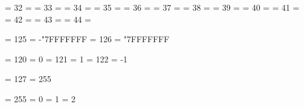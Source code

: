 \countdef   \lastallocatedcount     =    32 \lastallocatedcount     = \minallocatedregister
\countdef   \lastallocateddimen     =    33 \lastallocateddimen     = \minallocatedregister
\countdef   \lastallocatedskip      =    34 \lastallocatedskip      = \minallocatedregister
\countdef   \lastallocatedmuskip    =    35 \lastallocatedmuskip    = \minallocatedregister
\countdef   \lastallocatedbox       =    36 \lastallocatedbox       = \minallocatedregister
\countdef   \lastallocatedtoks      =    37 \lastallocatedtoks      = \minallocatedregister
\countdef   \lastallocatedread      =    38 \lastallocatedread      = \minallocatediochannel
\countdef   \lastallocatedwrite     =    39 \lastallocatedwrite     = \minallocatediochannel
\countdef   \lastallocatedmarks     =    40 \lastallocatedmarks     = \minallocatedregister
\countdef   \lastallocatedlanguage  =    41 \lastallocatedlanguage  = \minallocatedlanguage    %
\countdef   \lastallocatedinsertion =    42 \lastallocatedinsertion = \minallocatedinsert
\countdef   \lastallocatedfamily    =    43 \lastallocatedfamily    = \minallocatedfamily      %
\countdef   \lastallocatedattribute =    44 \lastallocatedattribute = \minallocatedregister

\countdef   \mincountervalue        =   125 \mincountervalue        = -"7FFFFFFF %
\countdef   \maxcountervalue        =   126 \maxcountervalue        =  "7FFFFFFF %


\countdef   \zerocount              =   120 \zerocount              =  0
\countdef   \plusone                =   121 \plusone                =  1
\countdef   \minusone               =   122 \minusone               = -1

\countdef   \normalpagebox          =   127 \normalpagebox          = 255  %


\countdef   \count@                 =   255 %
\dimendef   \dimen@                 =     0
\dimendef   \dimen@i                =     1 %
\dimendef   \dimen@ii               =     2

